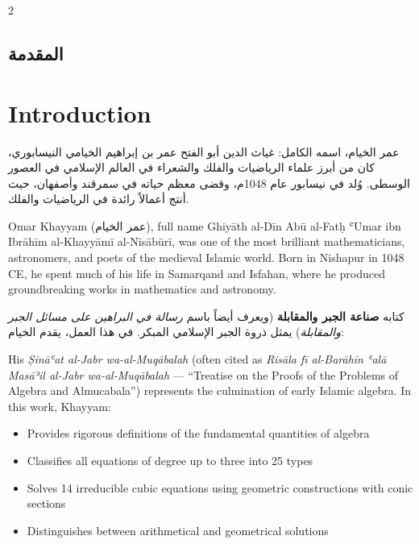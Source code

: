 \documentclass[11pt,a4paper]{book}
\begin{document}
\begin{paracol}{2}

\begin{Arabic}
\section*{المقدمة}
\end{Arabic}

\switchcolumn

\section*{Introduction}

\switchcolumn*

\begin{Arabic}
عمر الخيام، اسمه الكامل: غياث الدين أبو الفتح عمر بن إبراهيم الخيامي النيسابوري، كان من أبرز علماء الرياضيات والفلك والشعراء في العالم الإسلامي في العصور الوسطى. وُلد في نيسابور عام 1048م، وقضى معظم حياته في سمرقند وأصفهان، حيث أنتج أعمالاً رائدة في الرياضيات والفلك.
\end{Arabic}

\switchcolumn

Omar Khayyam (\textarabic{عمر الخيام}), full name Ghiyāth al-Dīn Abū al-Fatḥ ʿUmar ibn Ibrāhīm al-Khayyāmī al-Nīsābūrī, was one of the most brilliant mathematicians, astronomers, and poets of the medieval Islamic world. Born in Nishapur in 1048 CE, he spent much of his life in Samarqand and Isfahan, where he produced groundbreaking works in mathematics and astronomy.

\switchcolumn*

\begin{Arabic}
كتابه \textbf{صناعة الجبر والمقابلة} (ويعرف أيضاً باسم \textit{رسالة في البراهين على مسائل الجبر والمقابلة}) يمثل ذروة الجبر الإسلامي المبكر. في هذا العمل، يقدم الخيام:
\end{Arabic}

\switchcolumn

His \textit{Ṣināʿat al-Jabr wa-al-Muqābalah} (often cited as \textit{Risāla fī al-Barāhīn ʿalā Masāʾil al-Jabr wa-al-Muqābalah} --- ``Treatise on the Proofs of the Problems of Algebra and Almucabala'') represents the culmination of early Islamic algebra. In this work, Khayyam:

\end{paracol}

\begin{itemize}[noitemsep]
\item Provides rigorous definitions of the fundamental quantities of algebra
\item Classifies all equations of degree up to three into 25 types
\item Solves 14 irreducible cubic equations using geometric constructions with conic sections
\item Distinguishes between arithmetical and geometrical solutions
\end{itemize}
\end{document}
